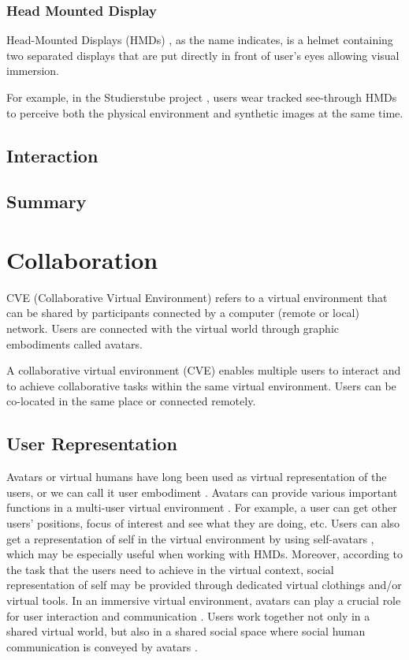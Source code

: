 \subsubsection{Head Mounted Display}
Head-Mounted Displays (HMDs) \citep{Melzer1997HMD}, as the name indicates, is a helmet containing two separated displays that are put directly in front of user's eyes allowing visual immersion. 

For example, in the Studierstube project \citep{Schmalstieg2002Stube}, users wear tracked see-through HMDs to perceive both the physical environment and synthetic images at the same time.

\subsection{Interaction}

\subsection{Summary}

\section{Collaboration}
CVE (Collaborative Virtual Environment) refers to a virtual environment that can be shared by participants connected by a computer (remote or local) network. Users are connected with the virtual world through graphic embodiments called avatars.

A collaborative virtual environment (CVE) \citep{Benford2001CVE} enables multiple users to interact \citep{Schroeder2006Usability} and to achieve collaborative tasks \citep{Dodds2009Using} within the same virtual environment. Users can be co-located in the same place or connected remotely.

\subsection{User Representation}
Avatars or virtual humans have long been used as virtual representation of the users, or we can call it user embodiment \citep{Benford1995UEC}. Avatars can provide various important functions in a multi-user virtual environment \citep{Thalmann2001VHR}. For example, a user can get other users' positions, focus of interest and see what they are doing, etc. Users can also get a representation of self in the virtual environment by using self-avatars \citep{Lok2003Effects}, which may be especially useful when working with HMDs. Moreover, according to the task that the users need to achieve in the virtual context, social representation of self may be provided through dedicated virtual clothings and/or virtual tools. In an immersive virtual environment, avatars can play a crucial role for user interaction and communication \citep{Slater1994Body}. Users work together not only in a shared virtual world, but also in a shared social space where social human communication is conveyed by avatars \citep{Roberts2004SSH}.

